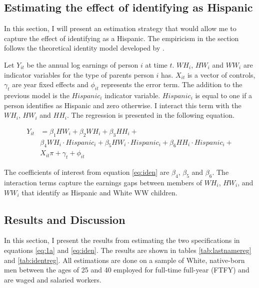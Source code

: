 \documentclass[12pt, fullpage]{article}
\begin{document}
\subsection{Estimating the effect of identifying as Hispanic}

In this section, I will present an estimation strategy that would allow me to capture the effect of identifying as a Hispanic. The empiricism in the section follows the theoretical identity model developed by \citet{akerlof2000economics}. 

Let $Y_{it}$ be the annual log earnings of person $i$ at time $t$. $WH_{i}$, $HW_{i}$ and $WW_{i}$ are indicator variables for the type of parents person $i$ has. $X_{it}$ is a vector of controls, $\gamma_{t}$ are year fixed effects and $\phi_{it}$ represents the error term. The addition to the previous model is the $Hispanic_{i}$ indicator variable. $Hispanic_{i}$ is equal to one if a person identifies as Hispanic and zero otherwise. I interact this term with the $WH_{i}$, $HW_{i}$ and $HH_{i}$.  The regression is presented in the following equation.

\begin{align} \label{eq:iden}
Y_{it} &= \beta_{1} HW_{i} +  \beta_{2} WH_{i} + \beta_{3} HH_{i} +\\
& \beta_{4} WH_{i} \cdot Hispanic_{i} + \beta_{5} HW_{i}\cdot Hispanic_{i} +  \beta_{6} HH_{i} \cdot Hispanic_{i}+ \nonumber \\
&X_{it} \pi + \gamma_{t}+\phi_{it} \nonumber
\end{align}

The coefficients of interest from equation \ref{eq:iden} are $\beta_{4}$, $\beta_{5}$ and $\beta_{6}$. The interaction terms capture the earnings gaps between members of $WH_{i}$, $HW_{i}$, and $WW_{i}$ that identify as Hispanic and White WW children. 

\subsection{Results and Discussion}\label{sec:results}

In this section, I present the results from estimating the two specifications in equations \ref{eq:1a} and \ref{eq:iden}. The results are shown in tables \ref{tab:lastnamereg} and \ref{tab:identreg}. All estimations are done on a sample of White, native-born men between the ages of 25 and 40 employed for full-time full-year (FTFY) and are waged and salaried workers.
\end{document}
